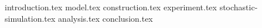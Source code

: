 {introduction.tex}
{model.tex}
{construction.tex}
{experiment.tex}
{stochastic-simulation.tex}
{analysis.tex}
{conclusion.tex}

